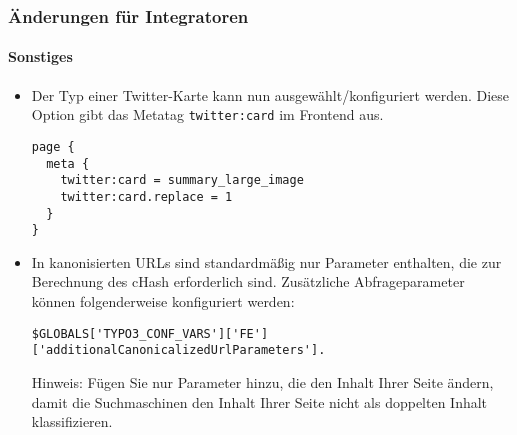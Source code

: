 \begin{frame}[fragile]
	\frametitle{Änderungen für Integratoren}
	\framesubtitle{Sonstiges}

	\lstset{basicstyle=\tiny\ttfamily}

	\begin{itemize}

		\item Der Typ einer Twitter-Karte kann nun ausgewählt/konfiguriert werden.
			Diese Option gibt das Metatag \texttt{twitter:card} im Frontend aus.

\begin{lstlisting}
page {
  meta {
    twitter:card = summary_large_image
    twitter:card.replace = 1
  }
}
\end{lstlisting}

		\item In kanonisierten URLs sind standardmäßig nur Parameter enthalten, die zur Berechnung des cHash erforderlich sind.
			Zusätzliche Abfrageparameter können folgenderweise konfiguriert werden:

\begin{lstlisting}
$GLOBALS['TYPO3_CONF_VARS']['FE']['additionalCanonicalizedUrlParameters'].
\end{lstlisting}

		\smaller
			Hinweis: Fügen Sie nur Parameter hinzu, die den Inhalt Ihrer Seite ändern, damit die Suchmaschinen  den Inhalt Ihrer Seite nicht als doppelten Inhalt klassifizieren.
		\normalsize

	\end{itemize}

\end{frame}


